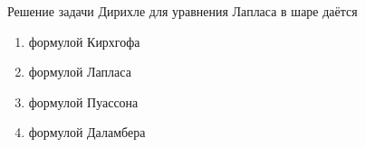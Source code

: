 Решение задачи Дирихле для уравнения Лапласа в шаре даётся

\begin{enumerate}[label=\arabic*)]
    \item формулой Кирхгофа
    \item формулой Лапласа
    \item формулой Пуассона
    \item формулой Даламбера
\end{enumerate}

